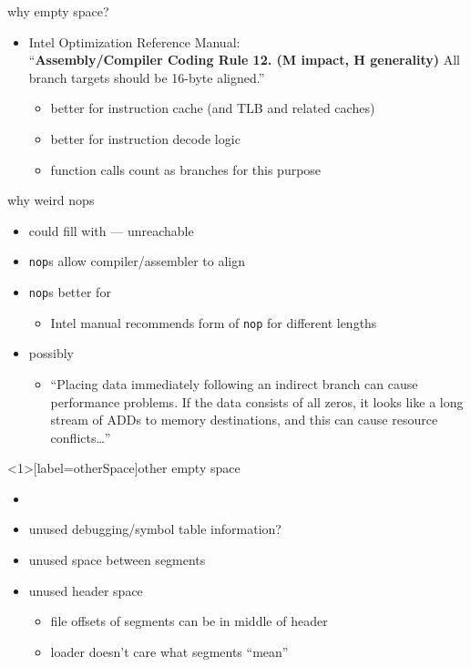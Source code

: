 \begin{frame}{why empty space?}
\begin{itemize}
\item Intel Optimization Reference Manual: \\
``\textbf{Assembly/Compiler Coding Rule 12. (M impact, H generality)} All branch targets should be 16-byte aligned.''
\begin{itemize}
    \item better for instruction cache {\small (and TLB and related caches)}
    \item better for instruction decode logic
    \item function calls count as branches for this purpose
\end{itemize}
\end{itemize}
\end{frame}

\begin{frame}{why weird nops}
    \begin{itemize}
    \item could fill with  --- unreachable
    \item {\tt nop}s allow compiler/assembler to align 
    \item {\tt nop}s better for 
        \begin{itemize}
        \item Intel manual recommends form of {\tt nop} for different lengths
        \end{itemize}
    \item possibly 
        \begin{itemize}
        \item ``Placing data immediately following an indirect branch
              can cause performance problems. If the data consists of all zeros,
              it looks like a long stream of ADDs to memory destinations, and this can cause
              resource conflicts\ldots''
        \end{itemize}
    \end{itemize}
\end{frame}

\begin{frame}<1>[label=otherSpace]{other empty space}
\begin{itemize}
\item {}
\item unused debugging/symbol table information?
\item unused space between segments
\item unused header space 
    \begin{itemize}
    \item file offsets of segments can be in middle of header
    \item loader doesn't care what segments ``mean''
    \end{itemize}
\end{itemize}
\end{frame}

